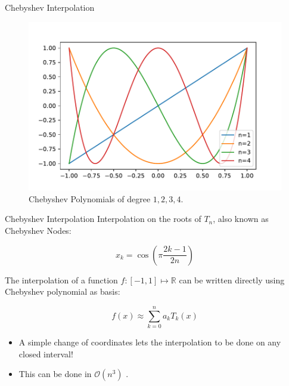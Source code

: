 \documentclass{beamer}
\newcommand{\R}{\mathbb{R}}
\newcommand{\bigO}{\mathscr{O}}
\begin{document}
\begin{frame}{Chebyshev Interpolation}
\begin{figure}
	\centering
	
	\includegraphics[scale=.6]{chebpoly}
	\caption{Chebyshev Polynomials of degree $1, 2, 3, 4$.}
\end{figure}
\end{frame}

\begin{frame}{Chebyshev Interpolation}
	Interpolation on the roots of $T_n$, also known as Chebyshev Nodes:
	
	\begin{equation*}
		x_k = \cos\left(\pi\frac{2k - 1}{2n}\right)
	\end{equation*}
	
	The interpolation of a function $f : [-1, 1] \mapsto \R$ can be written directly using Chebyshev polynomial as basis:
	
	\begin{equation*}
	f(x) \approx \sum_{k=0}^{n} a_k T_k(x)
	\end{equation*}
	
	\begin{itemize}
		\item A simple change of coordinates lets the interpolation to be done on any closed interval!
		\item This can be done in $\bigO(n^3)$ \cite{boyd:2013}.
	\end{itemize}
\end{frame}
\end{document}

